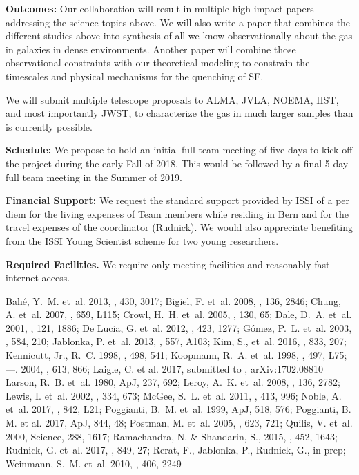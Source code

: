 \documentclass[11pt]{article}
\begin{document}
\textbf{Outcomes:} Our collaboration will result in multiple high impact papers addressing the science topics above.  We will also write a paper that combines the different studies above into synthesis of all we know observationally about the gas in galaxies in
dense environments.  Another paper will combine those observational
constraints with our theoretical modeling to constrain the timescales
and physical mechanisms for the quenching of SF.

We will submit multiple telescope proposals to ALMA, JVLA, NOEMA, HST, and most importantly JWST, 
 to characterize the gas in much larger samples than is currently possible.

\textbf{Schedule:} We propose to hold an initial full team meeting of five days to kick off the project during the early Fall of 2018. This would be followed by a final 5 day full team meeting in the Summer of 2019. 

\textbf{Financial Support:} We request the standard support provided
by ISSI of a per diem for the living expenses of Team members while
residing in Bern and for the travel expenses of the coordinator
(Rudnick). We would also appreciate benefiting from the ISSI Young
Scientist scheme for two young researchers.  

\textbf{Required Facilities.}  We require only meeting facilities and
reasonably fast internet access.

\footnotesize{{Bah\'e}, Y.~M. {et~al.} 2013, \mnras, 430, 3017; 
{Bigiel}, F. {et~al.} 2008, \aj, 136, 2846; 
{Chung}, A. {et~al.} 2007, \apjl, 659, L115; 
{Crowl}, H.~H. {et~al.} 2005, \aj, 130, 65; 
{Dale}, D.~A. {et~al.} 2001, \aj, 121, 1886; 
{De Lucia}, G. {et~al.} 2012, \mnras, 423, 1277; 
{G{\' o}mez}, P.~L. {et~al.} 2003, \apj, 584, 210; 
{Jablonka}, P. {et~al.} 2013, \aap, 557, A103; 
{Kim}, S., et~al. 2016, \apj, 833, 207;
{Kennicutt}, Jr., R.~C. 1998, \apj, 498, 541; 
{Koopmann}, R.~A. {et~al.} 1998, \apjl, 497, L75; 
---. 2004, \apj, 613, 866; 
Laigle, C. et al. 2017, submitted to \mnras, arXiv:1702.08810
{Larson}, R.~B. {et~al.} 1980, ApJ, 237, 692; 
{Leroy}, A.~K. {et~al.} 2008, \aj, 136, 2782; 
{Lewis}, I. {et~al.} 2002, \mnras, 334, 673; 
{McGee}, S.~L. {et~al.} 2011, \mnras, 413, 996; 
Noble, A. et~al. 2017, \apj, 842, L21;
{Poggianti}, B.~M. {et~al.} 1999, ApJ, 518, 576; 
Poggianti, B. M. et al. 2017, ApJ, 844, 48;
{Postman}, M. {et~al.} 2005, \apj, 623, 721; 
{Quilis}, V. {et~al.} 2000, Science, 288, 1617; 
{Ramachandra}, N. \& {Shandarin}, S., 2015, \mnras, 452, 1643;
Rudnick, G. et~al. 2017, \apj, 849, 27;
{Rerat}, F., Jablonka, P., Rudnick, G., in prep;
{Weinmann}, S.~M. {et~al.} 2010, \mnras, 406, 2249}
\end{document}
